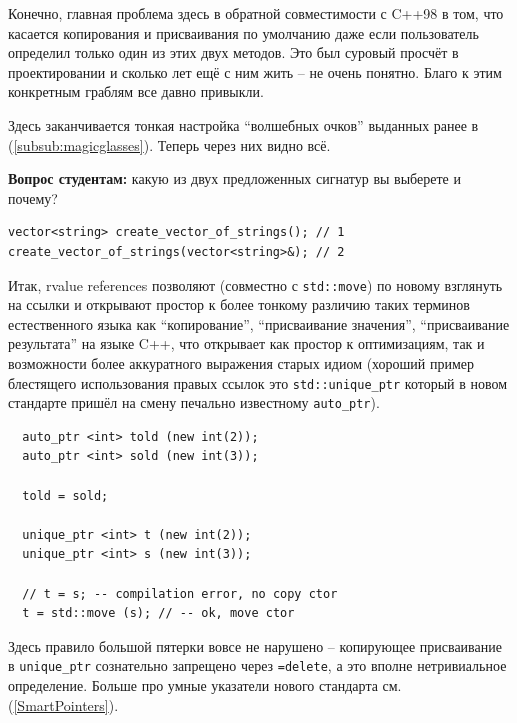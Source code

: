 \documentclass[a4paper,12pt,oneside]{book}
\newif\ifanswers
\begin{document}
Конечно, главная проблема здесь в обратной совместимости с C++98 в том, что касается копирования и присваивания по умолчанию даже если пользователь определил только один из этих двух методов. Это был суровый просчёт в проектировании и сколько лет ещё с ним жить -- не очень понятно. Благо к этим конкретным граблям все давно привыкли.

Здесь заканчивается тонкая настройка ``волшебных очков'' выданных ранее в (\ref{subsub:magicglasses}). Теперь через них видно всё.

\textbf{Вопрос студентам:} какую из двух предложенных сигнатур вы выберете и почему?

\begin{lstlisting}
vector<string> create_vector_of_strings(); // 1
create_vector_of_strings(vector<string>&); // 2
\end{lstlisting}

\ifanswers
Правильный ответ: их более одного. Всё изложение подталкивает к ответу (1), но тут возможен спор. В любом случае этот спор нужно вести с учётом конструкторов перемещения. Аргументировать (2) тут гораздо сложнее, но на практике-то все пишут именно так.
\fi

Итак, rvalue references позволяют (совместно с \lstinline!std::move!) по новому взглянуть на ссылки и открывают простор к более тонкому различию таких терминов естественного языка как ``копирование'', ``присваивание значения'', ``присваивание результата'' на языке C++, что открывает как простор к оптимизациям, так и возможности более аккуратного выражения старых идиом (хороший пример блестящего использования правых ссылок это \lstinline!std::unique_ptr! который в новом стандарте пришёл на смену печально известному \lstinline!auto_ptr!). 

\begin{lstlisting}
  auto_ptr <int> told (new int(2));
  auto_ptr <int> sold (new int(3));

  told = sold;

  unique_ptr <int> t (new int(2));
  unique_ptr <int> s (new int(3));

  // t = s; -- compilation error, no copy ctor
  t = std::move (s); // -- ok, move ctor
\end{lstlisting}

Здесь правило большой пятерки вовсе не нарушено -- копирующее присваивание в \lstinline!unique_ptr! сознательно запрещено через \lstinline!=delete!, а это вполне нетривиальное определение. Больше про умные указатели нового стандарта см. (\ref{SmartPointers}).
\end{document}
